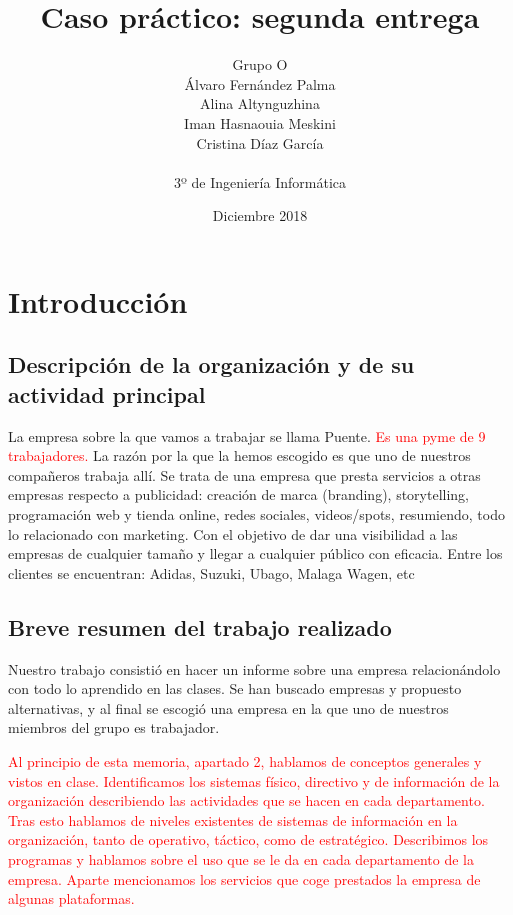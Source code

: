 \documentclass{article}
\title{Caso práctico: segunda entrega}
\author{Grupo O\\ Álvaro Fernández Palma\\ Alina Altynguzhina\\ Iman Hasnaouia Meskini\\ Cristina Díaz García\\ \\3º de Ingeniería Informática}
\date{Diciembre 2018}
\begin{document}

\begin{titlingpage}
\maketitle

\end{titlingpage}

\newpage

\tableofcontents

\newpage

\section{Introducción}

\subsection{Descripción de la organización y de su actividad principal} 

La empresa sobre la que vamos a trabajar se llama Puente. \textcolor{Red}{Es una pyme de 9 trabajadores.} La razón por la que la hemos escogido es que uno de nuestros compañeros trabaja allí. Se trata de una empresa que presta servicios a otras empresas respecto a publicidad: creación de marca (branding), storytelling, programación web y tienda online, redes sociales, videos/spots, resumiendo, todo lo relacionado con marketing. Con el objetivo de dar una visibilidad a las empresas de cualquier tamaño y llegar a cualquier público con eficacia. Entre los clientes se encuentran: Adidas, Suzuki, Ubago, Malaga Wagen, etc

\subsection{Breve resumen del trabajo realizado}

Nuestro trabajo consistió en hacer un informe sobre una empresa relacionándolo con todo lo aprendido en las clases.  Se han buscado empresas y propuesto alternativas, y al final se escogió una empresa en la que uno de nuestros miembros del grupo es trabajador.

\textcolor{Red}{Al principio de esta memoria, apartado 2, hablamos de conceptos generales y vistos en clase. Identificamos los sistemas físico, directivo y de información de la organización describiendo las actividades que se hacen en cada departamento. Tras esto hablamos de niveles existentes de sistemas de información en la organización, tanto de operativo, táctico, como de estratégico. Describimos los programas y hablamos sobre el uso que se le da en cada departamento de la empresa. Aparte mencionamos los servicios que coge prestados la empresa de algunas plataformas.}  
\end{document}
